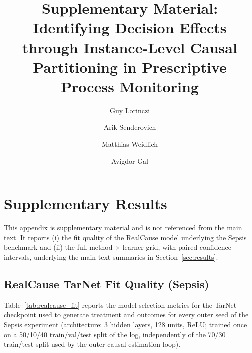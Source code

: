 \documentclass[manuscript,review,natbib=false]{acmart}
\begin{document}
\title{Supplementary Material: Identifying Decision Effects through Instance-Level Causal Partitioning in Prescriptive Process Monitoring}

\author{Guy Lorinczi}
\author{Arik Senderovich}
\author{Matthias Weidlich}
\author{Avigdor Gal}

\renewcommand{\shortauthors}{Lorinczi et al.}

\maketitle

\appendix
\section{Supplementary Results}
\label{sec:appendix}

This appendix is supplementary material and is not referenced from the main text. It reports (i) the fit quality of the RealCause model underlying the Sepsis benchmark and (ii) the full method $\times$ learner grid, with paired confidence intervals, underlying the main-text summaries in Section~\ref{sec:results}.

\subsection{RealCause TarNet Fit Quality (Sepsis)}
Table~\ref{tab:realcause_fit} reports the model-selection metrics for the TarNet checkpoint used to generate treatment and outcomes for every outer seed of the Sepsis experiment (architecture: 3 hidden layers, 128 units, ReLU; trained once on a 50/10/40 train/val/test split of the log, independently of the 70/30 train/test split used by the outer causal-estimation loop).
\end{document}
